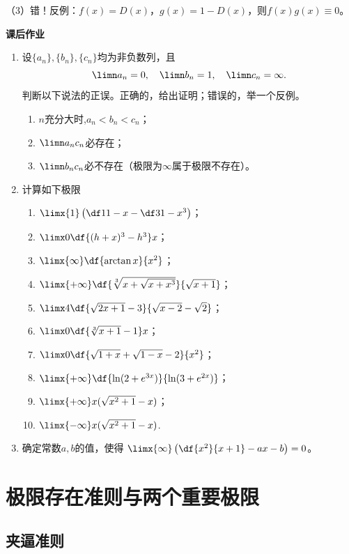 （3）错！反例：$f(x)=D(x)$，$g(x)=1-D(x)$，则$f(x)g(x)\equiv 0$。

\begin{ext}
	{\centering\bf 课后作业}
	
	\begin{enumerate}  
	  \item 设$\{a_n\},\{b_n\},\{c_n\}$均为非负数列，且
	  $$\limn a_n=0,\quad \limn b_n=1,\quad \limn c_n=\infty.$$
	  判断以下说法的正误。正确的，给出证明；错误的，举一个反例。
	  \begin{enumerate}[(1)]
	    \item $n$充分大时,$a_n<b_n<c_n$；
	    \item $\limn a_nc_n$必存在；
	    \item $\limn b_nc_n$必不存在（极限为$\infty$属于极限不存在）。
	  \end{enumerate}
	  \item 计算如下极限
	  \begin{enumerate}[(1)]
	    \item $\limx{1}\left(\df1{1-x}-\df3{1-x^3}\right)$；
	    \item $\limx0\df{(h+x)^3-h^3}x$；
	    \item $\limx{\infty}\df{\arctan x}{x^2}$；
	    \item $\limx{+\infty}\df{\sqrt[3]{x+\sqrt{x+x^3}}}{\sqrt{x+1}}$；
	    \item $\limx4\df{\sqrt{2x+1}-3}{\sqrt{x-2}-\sqrt2}$；
	    \item $\limx0\df{\sqrt[3]{x+1}-1}x$；
	    \item $\limx0\df{\sqrt{1+x}+\sqrt{1-x}-2}{x^2}$；
	    \item $\limx{+\infty}\df{\ln(2+e^{3x})}{\ln(3+e^{2x})}$；
	    \item $\limx{+\infty}x(\sqrt{x^2+1}-x)$；
	    \item $\limx{-\infty}x(\sqrt{x^2+1}-x)$.
	  \end{enumerate}
	  \item 确定常数$a,b$的值，使得
	  $\limx{\infty}\left(\df{x^2}{x+1}-ax-b\right)=0$。
	\end{enumerate}
\end{ext}

\section{极限存在准则与两个重要极限}

\subsection{夹逼准则}

